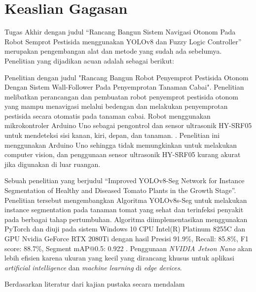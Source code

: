 \section{Keaslian Gagasan}
Tugas Akhir dengan judul “Rancang Bangun Sistem Navigasi Otonom Pada Robot Semprot Pestisida menggunakan YOLOv8 dan Fuzzy Logic Controller” merupakan pengembangan alat dan metode yang sudah ada sebelumya. Penelitian yang dijadikan acuan adalah sebagai berikut:
\begin{packed_enum}
	\item Penelitian dengan judul "Rancang Bangun Robot Penyemprot Pestisida Otonom Dengan Sistem Wall-Follower Pada Penyemprotan Tanaman Cabai". Penelitian melibatkan perancangan dan pembuatan robot penyemprot pestisida otonom yang mampu menavigasi melalui bedengan dan melakukan penyemprotan pestisida secara otomatis pada tanaman cabai. Robot menggunakan mikrokontroler Arduino Uno sebagai pengontrol dan sensor ultrasonik HY-SRF05 untuk mendeteksi sisi kanan, kiri, depan, dan tanaman. \cite{budiono2021rancang}. Penelitian ini menggunakan Arduino Uno sehingga tidak memungkinkan untuk melakukan computer vision, dan penggunaan sensor ultrasonik HY-SRF05 kurang akurat jika digunakan di luar ruangan.
	
	\item Sebuah penelitian yang berjudul “Improved YOLOv8-Seg Network for Instance Segmentation of Healthy and Diseased Tomato Plants in the Growth Stage”. Penelitian tersebut mengembangkan Algoritma YOLOv8s-Seg untuk melakukan instance segmentation pada tanaman tomat yang sehat dan terinfeksi penyakit pada berbagai tahap pertumbuhan. Algoritma diimplementasikan menggunakan PyTorch dan diuji pada sistem Windows 10 CPU Intel(R) Platinum 8255C dan GPU Nvidia GeForce RTX 2080Ti dengan hasil Presisi 91.9\%, Recall: 85.8\%, F1 score: 88.7\%, Segment mAP@0.5: 0.922 \cite{agriculture13081643}. Penggunaan \textit{NVIDIA Jetson Nano} akan lebih efisien karena ukuran yang kecil yang dirancang khusus untuk aplikasi \textit{artificial intelligence}  dan \textit{machine learning}  di \textit{ edge devices}.
	 
	\item 
	
\end{packed_enum}
Berdasarkan literatur dari kajian pustaka secara mendalam
